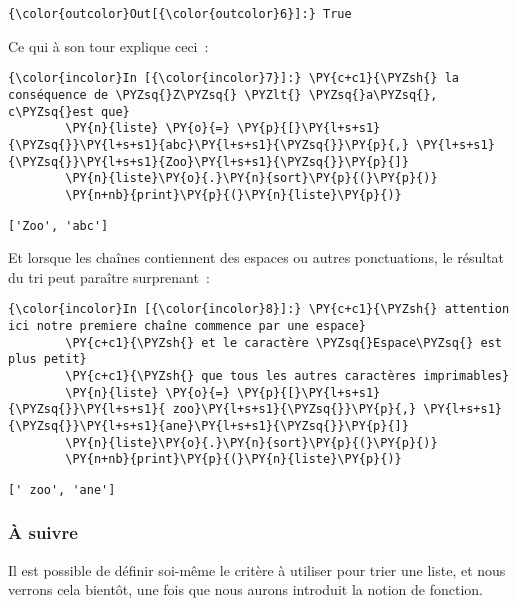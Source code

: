 \begin{Verbatim}[commandchars=\\\{\},frame=single,framerule=0.3mm,rulecolor=\color{cellframecolor}]
{\color{outcolor}Out[{\color{outcolor}6}]:} True
\end{Verbatim}
            
    Ce qui à son tour explique ceci~:

    \begin{Verbatim}[commandchars=\\\{\},frame=single,framerule=0.3mm,rulecolor=\color{cellframecolor}]
{\color{incolor}In [{\color{incolor}7}]:} \PY{c+c1}{\PYZsh{} la conséquence de \PYZsq{}Z\PYZsq{} \PYZlt{} \PYZsq{}a\PYZsq{}, c\PYZsq{}est que}
        \PY{n}{liste} \PY{o}{=} \PY{p}{[}\PY{l+s+s1}{\PYZsq{}}\PY{l+s+s1}{abc}\PY{l+s+s1}{\PYZsq{}}\PY{p}{,} \PY{l+s+s1}{\PYZsq{}}\PY{l+s+s1}{Zoo}\PY{l+s+s1}{\PYZsq{}}\PY{p}{]}
        \PY{n}{liste}\PY{o}{.}\PY{n}{sort}\PY{p}{(}\PY{p}{)}
        \PY{n+nb}{print}\PY{p}{(}\PY{n}{liste}\PY{p}{)}
\end{Verbatim}


    \begin{Verbatim}[commandchars=\\\{\},frame=single,framerule=0.3mm,rulecolor=\color{cellframecolor}]
['Zoo', 'abc']
\end{Verbatim}

    Et lorsque les chaînes contiennent des espaces ou autres ponctuations,
le résultat du tri peut paraître surprenant~:

    \begin{Verbatim}[commandchars=\\\{\},frame=single,framerule=0.3mm,rulecolor=\color{cellframecolor}]
{\color{incolor}In [{\color{incolor}8}]:} \PY{c+c1}{\PYZsh{} attention ici notre premiere chaîne commence par une espace}
        \PY{c+c1}{\PYZsh{} et le caractère \PYZsq{}Espace\PYZsq{} est plus petit}
        \PY{c+c1}{\PYZsh{} que tous les autres caractères imprimables}
        \PY{n}{liste} \PY{o}{=} \PY{p}{[}\PY{l+s+s1}{\PYZsq{}}\PY{l+s+s1}{ zoo}\PY{l+s+s1}{\PYZsq{}}\PY{p}{,} \PY{l+s+s1}{\PYZsq{}}\PY{l+s+s1}{ane}\PY{l+s+s1}{\PYZsq{}}\PY{p}{]}
        \PY{n}{liste}\PY{o}{.}\PY{n}{sort}\PY{p}{(}\PY{p}{)}
        \PY{n+nb}{print}\PY{p}{(}\PY{n}{liste}\PY{p}{)}
\end{Verbatim}


    \begin{Verbatim}[commandchars=\\\{\},frame=single,framerule=0.3mm,rulecolor=\color{cellframecolor}]
[' zoo', 'ane']
\end{Verbatim}

    \hypertarget{uxe0-suivre}{%
\subsubsection{À suivre}\label{uxe0-suivre}}

    Il est possible de définir soi-même le critère à utiliser pour trier une
liste, et nous verrons cela bientôt, une fois que nous aurons introduit
la notion de fonction.


    
    
    
